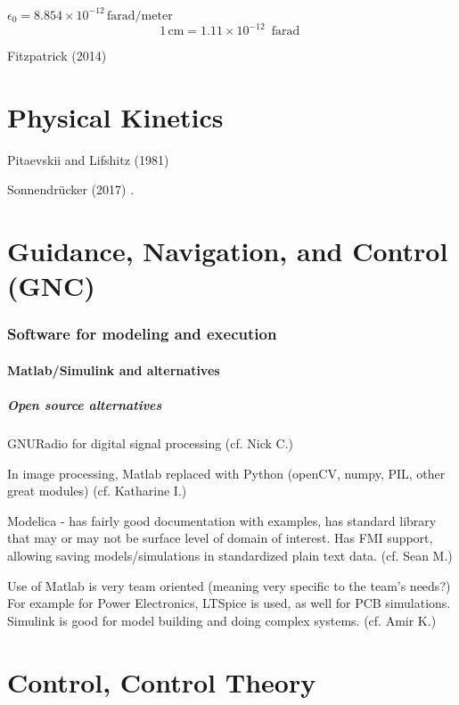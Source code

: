 \documentclass[10pt]{amsart}
\begin{document}
\begin{multicols*}{2}
$\epsilon_0 = 8.854 \times 10^{-12} \, \text{farad}/\text{meter}$
\[
\boxed{ 1 \, \text{cm} = 1.11 \times 10^{-12} \, \text{ farad }} 
\]



Fitzpatrick (2014) \cite{Fitz2014}

\part{Physical Kinetics}



Pitaevskii and Lifshitz (1981) \cite{PL1981}




Sonnendr\"{u}cker (2017) \cite{Sonn2017}.  

\part{Guidance, Navigation, and Control (GNC)}

\section{Software for modeling and execution}

\subsection{Matlab/Simulink and alternatives}

\subsubsection{Open source alternatives}

GNURadio for digital signal processing (cf. Nick C.)

In image processing, Matlab replaced with Python (openCV, numpy, PIL, other great modules) (cf. Katharine I.)

Modelica - has fairly good documentation with examples, has standard library that may or may not be surface level of domain of interest. Has FMI support, allowing saving models/simulations in standardized plain text data. (cf. Sean M.)

Use of Matlab is very team oriented (meaning very specific to the team's needs?) For example for Power Electronics, LTSpice is used, as well for PCB simulations. Simulink is good for model building and doing complex systems. (cf. Amir K.)

\part{Control, Control Theory}


\end{multicols*}
\end{document}
